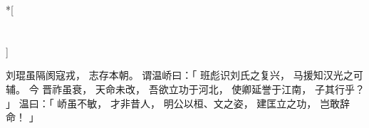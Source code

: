 
\switchcolumn[0]*[\section{}]

刘琨虽隔阂寇戎，
志存本朝。
谓温峤曰：「
    班彪识刘氏之复兴，
    马援知汉光之可辅。
    今
    晋祚虽衰，
    天命未改，
    吾欲立功于河北，
    使卿延誉于江南，
    子其行乎？
」
温曰：「
    峤虽不敏，
    才非昔人，
    明公以桓、文之姿，
    建匡立之功，
    岂敢辞命！
」

\switchcolumn



